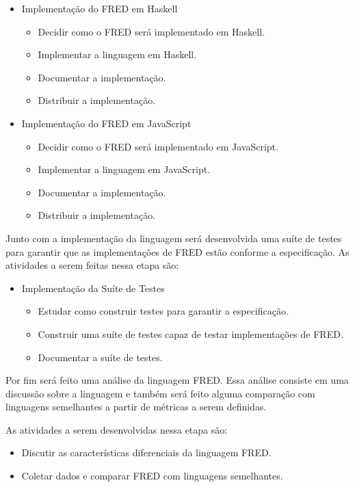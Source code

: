 \begin{itemize}
    \item Implementação do FRED em Haskell
    \begin{itemize}
        \item Decidir como o FRED será implementado em Haskell.
        \item Implementar a linguagem em Haskell.
        \item Documentar a implementação.
        \item Distribuir a implementação.
    \end{itemize}
    \item Implementação do FRED em JavaScript
    \begin{itemize}
        \item Decidir como o FRED será implementado em JavaScript.
        \item Implementar a linguagem em JavaScript.
        \item Documentar a implementação.
        \item Distribuir a implementação.
    \end{itemize}
\end{itemize}

Junto com a implementação da linguagem será desenvolvida uma suíte de testes para garantir 
que as implementações de FRED estão conforme a especificação. As atividades a serem
feitas nessa etapa são:

\begin{itemize}
    \item Implementação da Suíte de Testes
    \begin{itemize}
        \item Estudar como construir testes para garantir a especificação.
        \item Construir uma suíte de testes capaz de testar implementações de FRED.
        \item Documentar a suíte de testes.
    \end{itemize}
\end{itemize}

Por fim será feito uma análise da linguagem FRED. Essa análise consiste 
em uma discussão sobre a linguagem e também será feito alguma comparação
com linguagens semelhantes a partir de métricas a serem definidas.

As  atividades a serem desenvolvidas nessa etapa são:

\begin{itemize}
    \item Discutir as características diferenciais da linguagem FRED.
    \item Coletar dados e comparar FRED com linguagens semelhantes.
\end{itemize}
